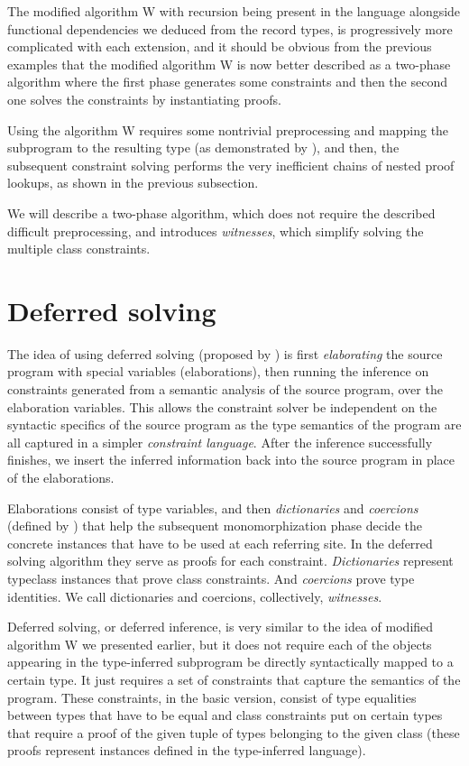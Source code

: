 The modified algorithm W with recursion being present in the language alongside functional dependencies we deduced from the record types, is progressively more complicated with each extension, and it should be obvious from the previous examples that the modified algorithm W is now better described as a two-phase algorithm where the first phase generates some constraints and then the second one solves the constraints by instantiating proofs.

Using the algorithm W requires some nontrivial preprocessing and mapping the subprogram to the resulting type (as demonstrated by \citet{jones1999typing}), and then, the subsequent constraint solving performs the very inefficient chains of nested proof lookups, as shown in the previous subsection.

We will describe a two-phase algorithm, which does not require the described difficult preprocessing, and introduces \emph{witnesses}, which simplify solving the multiple class constraints.

\section{Deferred solving}
\label{defer_solve}

The idea of using deferred solving (proposed by \citet{vytiniotis2011outsidein}) is first \emph{elaborating} the source program with special variables (elaborations), then running the inference on constraints generated from a semantic analysis of the source program, over the elaboration variables. This allows the constraint solver be independent on the syntactic specifics of the source program as the type semantics of the program are all captured in a simpler \emph{constraint language}. After the inference successfully finishes, we insert the inferred information back into the source program in place of the elaborations.

Elaborations consist of type variables, and then \emph{dictionaries} and \emph{coercions} (defined by \citet{vytiniotis2011outsidein}) that help the subsequent monomorphization phase decide the concrete instances that have to be used at each referring site. In the deferred solving algorithm they serve as proofs for each constraint. \emph{Dictionaries} represent typeclass instances that prove class constraints. And \emph{coercions} prove type identities. We call dictionaries and coercions, collectively, \emph{witnesses}.

Deferred solving, or deferred inference, is very similar to the idea of modified algorithm W we presented earlier, but it does not require each of the objects appearing in the type-inferred subprogram be directly syntactically mapped to a certain type. It just requires a set of constraints that capture the semantics of the program. These constraints, in the basic version, consist of type equalities between types that have to be equal and class constraints put on certain types that require a proof of the given tuple of types belonging to the given class (these proofs represent instances defined in the type-inferred language).

